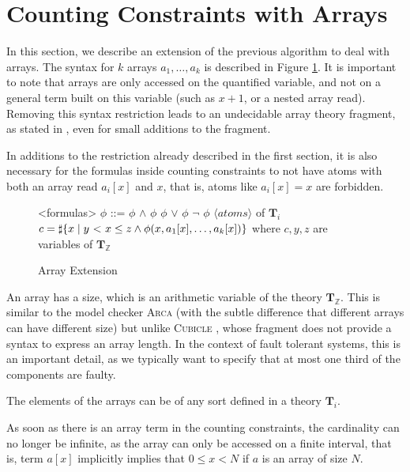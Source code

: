 \documentclass[]{article}
\begin{document}
{
\section{Counting Constraints with
Arrays}
\label{sec:arrays}

In this section, we describe an extension of the previous algorithm to
deal with arrays. The syntax for $k$ arrays $a_1, \ldots, a_k$ is
described in Figure \ref{syntaxarray}. It is important to note that
arrays are only accessed on the quantified variable, and not on a
general term built on this variable (such as $x + 1$, or a nested
array read). Removing this syntax restriction leads to an undecidable
array theory fragment, as stated in
\cite{bradley2006s}, even for small additions to the
fragment.

In additions to the restriction already described in the first section, it is also necessary for the
formulas inside counting constraints to not have atoms with both an array read $a_i[x]$ and $x$,
that is, atoms like $a_i[x] = x$ are forbidden.

\begin{figure}[h]
\begin{grammar}

<formulas> $\phi$ ::= $\phi$ $\land$ $\phi$
\alt $\phi$ $\lor$ $\phi$
\alt $\lnot$ $\phi$
\alt $\langle atoms\rangle$ of $\mathbf{T}_i$
\alt $c = \sharp\{ x \mid y\ \text{\textless}\ x \le z \land \phi(x, a_1[x], \ldots, a_k[x]) \}$ where $c, y, z$ are variables of $\mathbf{T}_\mathbb{Z}$

\end{grammar}
\caption{Array Extension}
\label{syntaxarray}
\end{figure}


An array has a size, which is an arithmetic variable of the theory
$\mathbf{T}_\mathbb{Z}$. This is similar to the model checker \textsc{Arca}
\cite{AlbertiGP16} (with the subtle difference that
different arrays can have different size) but unlike \textsc{Cubicle}
\cite{ConchonGKMZ12}, whose fragment does not
provide a syntax to express an array length. In the context of fault
tolerant systems, this is an important detail, as we typically want to
specify that at most one third of the components are faulty.

The elements of the arrays can be of any sort defined in a theory $\mathbf{T}_i$.

As soon as there is an array term in the counting constraints, the
cardinality can no longer be infinite, as the array can only be accessed
on a finite interval, that is, term $a[x]$ implicitly implies that $0 \le x < N$ if $a$ is an array of size $N$.

}
\end{document}

